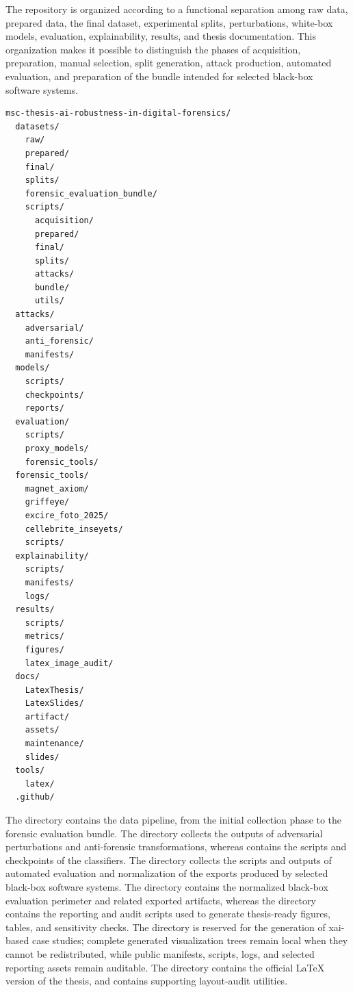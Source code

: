 The repository is organized according to a functional separation among raw data,
prepared data, the final dataset, experimental splits, perturbations, white-box models, evaluation, explainability, results, and thesis documentation. This
organization makes it possible to distinguish the phases of acquisition,
preparation, manual selection, split generation, attack production, automated
evaluation, and preparation of the bundle intended for selected black-box
software systems.

\begin{lstlisting}[float=p, caption={Simplified structure of the experimental repository.}, label={lst:repository-structure}]
msc-thesis-ai-robustness-in-digital-forensics/
  datasets/
    raw/
    prepared/
    final/
    splits/
    forensic_evaluation_bundle/
    scripts/
      acquisition/
      prepared/
      final/
      splits/
      attacks/
      bundle/
      utils/
  attacks/
    adversarial/
    anti_forensic/
    manifests/
  models/
    scripts/
    checkpoints/
    reports/
  evaluation/
    scripts/
    proxy_models/
    forensic_tools/
  forensic_tools/
    magnet_axiom/
    griffeye/
    excire_foto_2025/
    cellebrite_inseyets/
    scripts/
  explainability/
    scripts/
    manifests/
    logs/
  results/
    scripts/
    metrics/
    figures/
    latex_image_audit/
  docs/
    LatexThesis/
    LatexSlides/
    artifact/
    assets/
    maintenance/
    slides/
  tools/
    latex/
  .github/
\end{lstlisting}
\clearpage

The  directory contains the data pipeline, from the initial
collection phase to the forensic evaluation bundle. The 
directory collects the outputs of adversarial perturbations and anti-forensic
transformations, whereas  contains the scripts and checkpoints
of the classifiers. The  directory collects the scripts
and outputs of automated evaluation and normalization of the exports produced by
selected black-box software systems. The  directory
contains the normalized black-box evaluation perimeter and related exported
artifacts, whereas the  directory contains the
reporting and audit scripts used to generate thesis-ready figures, tables, and
sensitivity checks. The  directory is reserved for the
generation of \gls{xai}-based case studies; complete generated visualization
trees remain local when they cannot be redistributed, while public manifests,
scripts, logs, and selected reporting assets remain auditable. The
 directory contains the official LaTeX version of
the thesis, and  contains supporting layout-audit
utilities.


